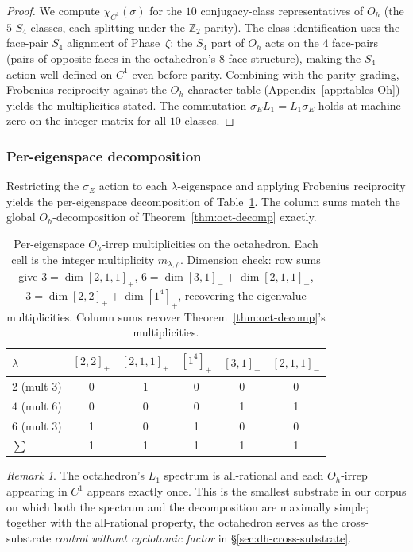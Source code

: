 \documentclass[12pt,a4paper]{article}
\theoremstyle{definition}
\theoremstyle{remark}
\newtheorem{remark}[theorem]{Remark}
\newcommand{\bZ}{\mathbb{Z}}
\begin{document}
\begin{proof}
We compute $\chi_{C^1}(\sigma)$ for the $10$ conjugacy-class representatives
of $O_h$ (the $5$ $S_4$ classes, each splitting under the $\bZ_2$ parity).
The class identification uses the face-pair $S_4$ alignment of Phase~$\zeta$:
the $S_4$ part of $O_h$ acts on the $4$ face-pairs (pairs of opposite faces
in the octahedron's $8$-face structure), making the $S_4$ action well-defined
on $C^1$ even before parity. Combining with the parity grading, Frobenius
reciprocity against the $O_h$ character table
(Appendix~\ref{app:tables-Oh}) yields the multiplicities stated. The
commutation $\sigma_E L_1 = L_1 \sigma_E$ holds at machine zero on the
integer matrix for all $10$ classes.
\end{proof}

\subsubsection{Per-eigenspace decomposition}\label{sec:oct-per-cluster}

Restricting the $\sigma_E$ action to each $\lambda$-eigenspace and applying
Frobenius reciprocity yields the per-eigenspace decomposition
of Table~\ref{tab:oct-per-cluster}. The column sums match the global
$O_h$-decomposition of Theorem~\ref{thm:oct-decomp} exactly.

\begin{table}[H]
\centering
\begin{tabular}{lccccc}
\toprule
$\lambda$ & $[2,2]_+$ & $[2,1,1]_+$ & $[1^4]_+$ & $[3,1]_-$ & $[2,1,1]_-$ \\
\midrule
$2$ (mult $3$) & 0 & 1 & 0 & 0 & 0 \\
$4$ (mult $6$) & 0 & 0 & 0 & 1 & 1 \\
$6$ (mult $3$) & 1 & 0 & 1 & 0 & 0 \\
\midrule
$\sum$ & 1 & 1 & 1 & 1 & 1 \\
\bottomrule
\end{tabular}
\caption{Per-eigenspace $O_h$-irrep multiplicities on the octahedron.
Each cell is the integer multiplicity $m_{\lambda, \rho}$. Dimension
check: row sums give $3 = \dim [2,1,1]_+$, $6 = \dim [3,1]_- + \dim
[2,1,1]_-$, $3 = \dim [2,2]_+ + \dim [1^4]_+$, recovering the eigenvalue
multiplicities. Column sums recover Theorem~\ref{thm:oct-decomp}'s
multiplicities.}\label{tab:oct-per-cluster}
\end{table}

\begin{remark}
The octahedron's $L_1$ spectrum is all-rational and each $O_h$-irrep
appearing in $C^1$ appears exactly once. This is the smallest substrate
in our corpus on which both the spectrum and the decomposition are
maximally simple; together with the all-rational property, the octahedron
serves as the cross-substrate \emph{control without cyclotomic factor}
in \S\ref{sec:dh-cross-substrate}.
\end{remark}
\end{document}
